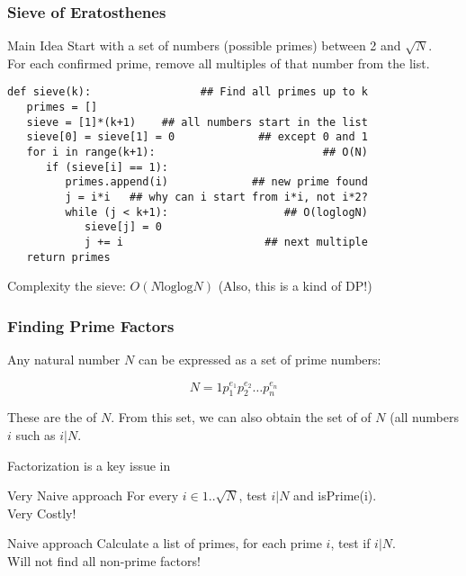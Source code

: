 \documentclass{beamer}
\begin{document}
\begin{frame}
  \frametitle{Sieve of Eratosthenes}

  {\smaller
  \begin{block}{Main Idea}
    Start with a set of numbers (possible primes) between 2 and $\sqrt{N}$.\\
    For each confirmed prime, remove all multiples of that number from the list.
  \end{block}

  \begin{exampleblock}{}
\begin{verbatim}
def sieve(k):                 ## Find all primes up to k
   primes = []
   sieve = [1]*(k+1)    ## all numbers start in the list
   sieve[0] = sieve[1] = 0             ## except 0 and 1
   for i in range(k+1):                          ## O(N)
      if (sieve[i] == 1):
         primes.append(i)             ## new prime found
         j = i*i   ## why can i start from i*i, not i*2?
         while (j < k+1):                  ## O(loglogN)
            sieve[j] = 0
            j += i                      ## next multiple
   return primes
\end{verbatim}
  \end{exampleblock}
  
  Complexity the sieve: $O(N\text{loglog}N)$ (Also, this is a kind of DP!)
  }
\end{frame}

\begin{frame}
  \frametitle{Finding Prime Factors}
  
  {\smaller 

    Any natural number $N$ can be expressed as a 
    set of prime numbers: 

    \begin{equation*}
      N=1p_1^{e_1}p_2^{e_2}\ldots p_n^{e_n}
    \end{equation*}

    These are the  of $N$. From this set, we
    can also obtain the set of  of $N$ (all numbers
    $i$ such as $i|N$.

    \medskip
    
    Factorization is a key issue in 

    \begin{block}{Very Naive approach}
      For every $i \in 1..\sqrt{N}$, test $i|N$ and isPrime(i).\\
      \smallskip
      \hfill Very Costly!
    \end{block}

    \begin{block}{Naive approach}
      Calculate a list of primes, for each prime $i$, test if $i|N$.\\
      \smallskip
      \hfill Will not find all non-prime factors!
    \end{block}
}
\end{frame}
\end{document}

